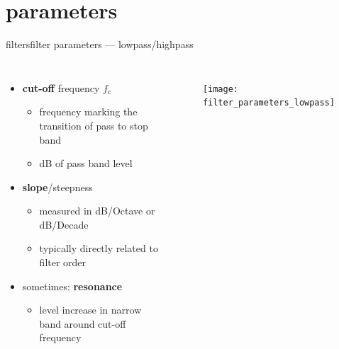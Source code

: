 \section{parameters}
        \begin{frame}{filters}{filter parameters --- lowpass/highpass}
            \begin{columns}
                \begin{itemize}
                    \item   \textbf{cut-off} frequency $f_\mathrm{c}$
                        \begin{itemize}
                            \item   frequency marking the transition of pass to stop band
                            \item   \unit[-3]{dB} of pass band level
                        \end{itemize}
                    \smallskip
                    \item   \textbf{slope}/steepness
                        \begin{itemize}
                            \item   measured in dB/Octave or dB/Decade
                            \item   typically directly related to filter order
                        \end{itemize}
                    \smallskip
                    \item   sometimes: \textbf{resonance}    
                        \begin{itemize}
                            \item   level increase in narrow band around cut-off frequency
                        \end{itemize}
                \end{itemize}
                \begin{figure}%
                    \texttt{[image: filter\_parameters\_lowpass]}%
                \end{figure}
            \end{columns}
        \end{frame}
